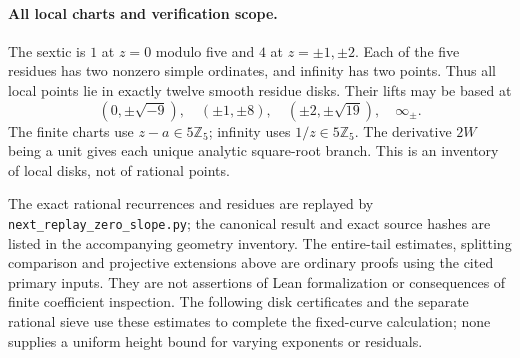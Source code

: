 \paragraph{All local charts and verification scope.}
The sextic is \(1\) at \(z=0\) modulo five and \(4\) at
\(z=\pm1,\pm2\). Each of the five residues has two nonzero simple
ordinates, and infinity has two points. Thus all local points lie
in exactly twelve smooth residue disks. Their lifts may be based at
\[
 (0,\pm\sqrt{-9}),\quad(\pm1,\pm8),\quad
 (\pm2,\pm\sqrt{19}),\quad\infty_\pm.
\]
The finite charts use \(z-a\in5\mathbb Z_5\); infinity uses
\(1/z\in5\mathbb Z_5\). The derivative \(2W\) being a unit gives
each unique analytic square-root branch. This is an inventory of
local disks, not of rational points.

The exact rational recurrences and residues are replayed by
\texttt{next\_replay\_zero\_slope.py}; the canonical result and exact
source hashes are listed in the accompanying geometry inventory.
The entire-tail estimates, splitting comparison and projective
extensions above are ordinary proofs using the cited primary inputs.
They are not assertions of Lean formalization or consequences of
finite coefficient inspection. The following disk certificates and
the separate rational sieve use these estimates to complete the
fixed-curve calculation; none supplies a uniform height bound for
varying exponents or residuals.
